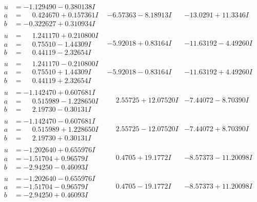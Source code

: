 \documentclass[1p]{elsarticle_modified}
\theoremstyle{definition}
\begin{document}
$$\begin{array}{c|c|c}
\begin{aligned}
u &= -1.129490 - 0.380138 I \\
a &= \phantom{-}0.424670 + 0.157361 I \\
b &= -0.322627 + 0.310934 I\end{aligned}
 & -6.57363 - 8.18913 I & -13.0291 + 11.3346 I \\ \hline\begin{aligned}
u &= \phantom{-}1.241170 + 0.210800 I \\
a &= \phantom{-}0.75510 - 1.44309 I \\
b &= \phantom{-}0.44119 - 2.32654 I\end{aligned}
 & -5.92018 + 0.83164 I & -11.63192 - 4.49260 I \\ \hline\begin{aligned}
u &= \phantom{-}1.241170 - 0.210800 I \\
a &= \phantom{-}0.75510 + 1.44309 I \\
b &= \phantom{-}0.44119 + 2.32654 I\end{aligned}
 & -5.92018 - 0.83164 I & -11.63192 + 4.49260 I \\ \hline\begin{aligned}
u &= -1.142470 + 0.607681 I \\
a &= \phantom{-}0.515989 - 1.228650 I \\
b &= \phantom{-}2.19730 - 0.30131 I\end{aligned}
 & \phantom{-}2.55725 + 12.07520 I & -7.44072 - 8.70390 I \\ \hline\begin{aligned}
u &= -1.142470 - 0.607681 I \\
a &= \phantom{-}0.515989 + 1.228650 I \\
b &= \phantom{-}2.19730 + 0.30131 I\end{aligned}
 & \phantom{-}2.55725 - 12.07520 I & -7.44072 + 8.70390 I \\ \hline\begin{aligned}
u &= -1.202640 + 0.655976 I \\
a &= -1.51704 + 0.96579 I \\
b &= -2.94250 - 0.46093 I\end{aligned}
 & \phantom{-}0.4705 + 19.1772 I & -8.57373 - 11.20098 I \\ \hline\begin{aligned}
u &= -1.202640 - 0.655976 I \\
a &= -1.51704 - 0.96579 I \\
b &= -2.94250 + 0.46093 I\end{aligned}
 & \phantom{-}0.4705 - 19.1772 I & -8.57373 + 11.20098 I \\ \hline\begin{aligned}

\end{aligned}
\end{array}$$
\end{document}
